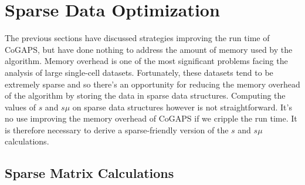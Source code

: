 \documentclass[]{article}
\begin{document}
\section{Sparse Data Optimization}

The previous sections have discussed strategies improving the run time of CoGAPS, but have done nothing to address the amount of memory used by the algorithm. Memory overhead is one of the most significant problems facing the analysis of large single-cell datasets. Fortunately, these datasets tend to be extremely sparse and so there's an opportunity for reducing the memory overhead of the algorithm by storing the data in sparse data structures. Computing the values of $s$ and $s\mu$ on sparse data structures however is not straightforward. It's no use improving the memory overhead of CoGAPS if we cripple the run time. It is therefore necessary to derive a sparse-friendly version of the $s$ and $s\mu$ calculations.

\subsection{Sparse Matrix Calculations}
\end{document}
